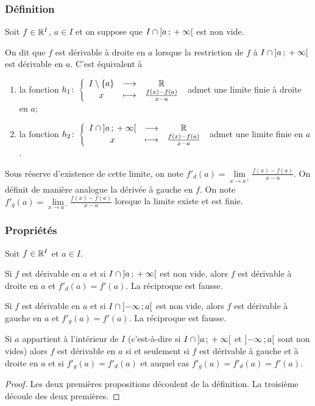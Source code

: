 \subsubsection{Définition}
Soit \(f \in \mathbb{R}^I\), \(a \in I\) et on suppose que \(I \cap
\left] a \, ; {} +\infty \right[\) est non vide.
\begin{defdef}
  On dit que \(f\) est dérivable à droite en \(a\) lorsque la restriction de
  \(f\) à \(I \cap \left] a \, ; {} +\infty \right[\) est dérivable en \(a\). C'est
  équivalent à
  \begin{enumerate}
    \item la fonction
      \(h_1\colon\left\{\begin{array}{ccc}I\setminus\{a\} & \longrightarrow &\mathbb{R}\\x & \longmapsto & \frac{f(x)-f(a)}{x-a}\end{array}\right.\) admet
      une limite finie à droite en \(a\);
    \item la fonction \(h_2\colon\left\{\begin{array}{ccc}I \cap
      \left] a \, ; {} +\infty \right[ & \longrightarrow &\mathbb{R}\\x & \longmapsto & \frac{f(x)-f(a)}{x-a}\end{array}\right.\) admet une
      limite finie en \(a\).
  \end{enumerate}
  Sous réserve d'existence de cette limite, on note \(f'_d(a) = \lim\limits_{x
  \to a^+}\frac{f(x)-f(a)}{x-a}\). On définit de manière analogue la dérivée à
  gauche en \(f\). On note \(f'_g(a) = \lim\limits_{x \to
  a^-}\frac{f(x)-f(a)}{x-a}\) lorsque la limite existe et est finie.
\end{defdef}

\subsubsection{Propriétés}

Soit \(f \in \mathbb{R}^I\) et \(a \in I\).
\begin{prop}
  Si \(f\) est dérivable en \(a\) et si \(I\cap \left] a \, ; {} +\infty \right[\) est
  non vide, alors \(f\) est dérivable à droite en \(a\) et \(f'_d(a)=f'(a)\). La
  réciproque est fausse.
\end{prop}
\begin{prop}
  Si \(f\) est dérivable en \(a\) et si \(I\cap \left] -\infty \, ; {} a \right[\) est
  non vide, alors \(f\) est dérivable à gauche en \(a\) et \(f'_g(a)=f'(a)\). La
  réciproque est fausse.
\end{prop}
\begin{prop}
  Si \(a\) appartient à l'intérieur de \(I\) (c'est-à-dire si \(I\cap
  \left] a \, ; {} +\infty \right[\) et \(\left] -\infty \, ; {} a \right[\) sont non vides)
  alors \(f\) est dérivable en \(a\) si et seulement si \(f\) est dérivable à
  gauche et à droite en \(a\) et si \(f'_g(a) = f'_d(a)\) et auquel cas
  \(f'_g(a)=f'_d(a)=f'(a)\).
\end{prop}
\begin{proof}
  Les deux premières propositions découlent de la définition. La troisième
  découle des deux premières.
\end{proof}

